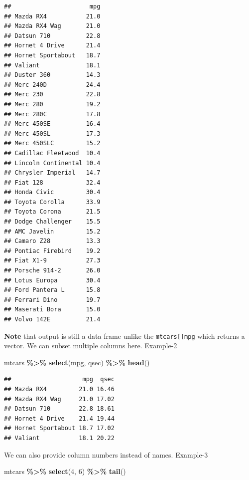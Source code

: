 \documentclass[
]{book}
\newenvironment{Shaded}{\begin{snugshade}}{\end{snugshade}}
\newcommand{\DecValTok}[1]{\textcolor[rgb]{0.00,0.00,0.81}{#1}}
\newcommand{\FunctionTok}[1]{\textcolor[rgb]{0.13,0.29,0.53}{\textbf{#1}}}
\newcommand{\NormalTok}[1]{#1}
\newcommand{\SpecialCharTok}[1]{\textcolor[rgb]{0.81,0.36,0.00}{\textbf{#1}}}
\begin{document}
\begin{verbatim}
##                      mpg
## Mazda RX4           21.0
## Mazda RX4 Wag       21.0
## Datsun 710          22.8
## Hornet 4 Drive      21.4
## Hornet Sportabout   18.7
## Valiant             18.1
## Duster 360          14.3
## Merc 240D           24.4
## Merc 230            22.8
## Merc 280            19.2
## Merc 280C           17.8
## Merc 450SE          16.4
## Merc 450SL          17.3
## Merc 450SLC         15.2
## Cadillac Fleetwood  10.4
## Lincoln Continental 10.4
## Chrysler Imperial   14.7
## Fiat 128            32.4
## Honda Civic         30.4
## Toyota Corolla      33.9
## Toyota Corona       21.5
## Dodge Challenger    15.5
## AMC Javelin         15.2
## Camaro Z28          13.3
## Pontiac Firebird    19.2
## Fiat X1-9           27.3
## Porsche 914-2       26.0
## Lotus Europa        30.4
## Ford Pantera L      15.8
## Ferrari Dino        19.7
## Maserati Bora       15.0
## Volvo 142E          21.4
\end{verbatim}

\textbf{Note} that output is still a data frame unlike the \texttt{mtcars{[}{[}\textquotesingle{}mpg\textquotesingle{}{]}{]}} which returns a vector. We can subset multiple columns here. Example-2

\begin{Shaded}
\begin{Highlighting}[]
\NormalTok{mtcars }\SpecialCharTok{\%\textgreater{}\%} 
  \FunctionTok{select}\NormalTok{(mpg, qsec) }\SpecialCharTok{\%\textgreater{}\%} 
  \FunctionTok{head}\NormalTok{()}
\end{Highlighting}
\end{Shaded}

\begin{verbatim}
##                    mpg  qsec
## Mazda RX4         21.0 16.46
## Mazda RX4 Wag     21.0 17.02
## Datsun 710        22.8 18.61
## Hornet 4 Drive    21.4 19.44
## Hornet Sportabout 18.7 17.02
## Valiant           18.1 20.22
\end{verbatim}

We can also provide column numbers instead of names. Example-3

\begin{Shaded}
\begin{Highlighting}[]
\NormalTok{mtcars }\SpecialCharTok{\%\textgreater{}\%} 
  \FunctionTok{select}\NormalTok{(}\DecValTok{4}\NormalTok{, }\DecValTok{6}\NormalTok{) }\SpecialCharTok{\%\textgreater{}\%} 
  \FunctionTok{tail}\NormalTok{()}
\end{Highlighting}
\end{Shaded}
\end{document}

